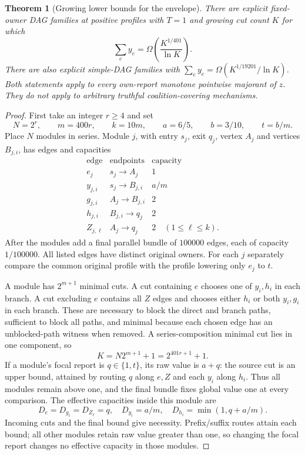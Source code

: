 \documentclass[11pt]{article}
\newtheorem{theorem}{Theorem}[section]
\theoremstyle{definition}\newtheorem{definition}[theorem]{Definition}
\theoremstyle{remark}\newtheorem{remark}[theorem]{Remark}
\begin{document}
\begin{theorem}[Growing lower bounds for the envelope]
\label{net:envelope-lower}
There are explicit fixed-owner DAG families at positive profiles with $T=1$
and growing cut count $K$ for which
\[
 \sum_ey_e=\Omega\!\left(\frac{K^{1/401}}{\ln K}\right).
\]
There are also explicit simple-DAG families with
$\sum_ey_e=\Omega(K^{1/19201}/\ln K)$.
Both statements apply to every own-report monotone pointwise majorant of $z$.
They do not apply to arbitrary truthful coalition-covering mechanisms.
\end{theorem}
\begin{proof}
First take an integer $r\ge4$ and set
\[
 N=2^r,\qquad m=400r,\qquad k=10m,\qquad
 a=6/5,\qquad b=3/10,\qquad t=b/m.
\]
Place $N$ modules in series.  Module $j$, with entry $s_j$, exit $q_j$,
vertex $A_j$ and vertices $B_{j,i}$, has edges and capacities
\[
 \begin{array}{c|c|c}
 \text{edge}&\text{endpoints}&\text{capacity}\\\hline
 e_j&s_j\to A_j&1\\
 y_{j,i}&s_j\to B_{j,i}&a/m\\
 g_{j,i}&A_j\to B_{j,i}&2\\
 h_{j,i}&B_{j,i}\to q_j&2\\
 Z_{j,\ell}&A_j\to q_j&2\quad(1\le\ell\le k).
 \end{array}
\]
After the modules add a final parallel bundle of $100000$ edges, each of
capacity $1/100000$.  All listed edges have distinct original owners.
For each $j$ separately compare the common original profile with the profile
lowering only $e_j$ to $t$.

A module has $2^{m+1}$ minimal cuts.  A cut containing $e$ chooses one of
$y_i,h_i$ in each branch.  A cut excluding $e$ contains all $Z$ edges and
chooses either $h_i$ or both $y_i,g_i$ in each branch.
These are necessary to block the direct and branch paths, sufficient to block
all paths, and minimal because each chosen edge has an unblocked-path witness
when removed.  A series-composition minimal cut lies in one component, so
\begin{equation}\label{net:aggregate-K}
 K=N2^{m+1}+1=2^{401r+1}+1.
\end{equation}
If a module's focal report is $q\in\{1,t\}$, its raw value is $a+q$:
the source cut is an upper bound, attained by routing $q$ along $e,Z$ and
each $y_i$ along $h_i$.  Thus all modules remain above one, and the final
bundle fixes global value one at every comparison.
The effective capacities inside this module are
\[
 D_e=D_{g_i}=D_{Z_\ell}=q,\quad D_{y_i}=a/m,\quad
 D_{h_i}=\min(1,q+a/m).
\]
Incoming cuts and the final bound give necessity.  Prefix/suffix routes
attain each bound; all other modules retain raw value greater than one, so
changing the focal report changes no effective capacity in those modules.


\end{proof}
\end{document}
